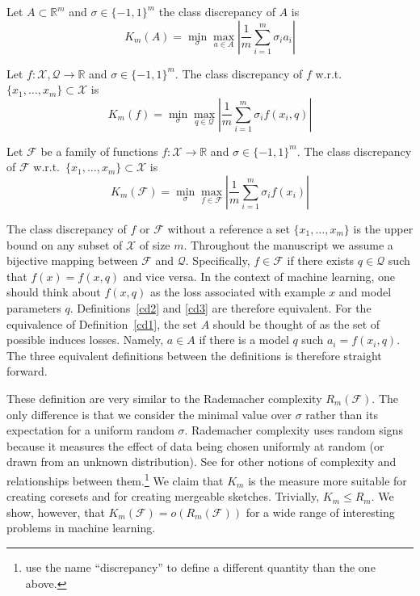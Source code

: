 \documentclass[anon,12pt]{colt2019} %
\newcommand{\R}{\mathbb{R}}
\newcommand{\F}{\mathcal{F}}
\newcommand{\X}{\mathcal{X}}
\newcommand{\Q}{\mathcal{Q}}
\begin{document}
\begin{definition} \label{cd1}
Let $A \subset \R^m$ and $\sigma \in \{-1,1\}^m$ the class discrepancy of $A$ is 
\[
K_m(A)  = \min_\sigma \max_{a\in A} \left| \frac{1}{m} \sum_{i=1}^{m}  \sigma_i  a_i\right| 
\]
\end{definition}
%
\begin{definition}\label{cd2}
Let $f:\X,\Q\rightarrow\R$ and $\sigma \in \{-1,1\}^m$. 
The class discrepancy of $f$ w.r.t.\ $\{x_1,\ldots,x_m\} \subset \X$ is 
\[
K_m(f) =  \min_{\sigma} \max_{q \in \Q}  \left|\frac{1}{m} \sum_{i=1}^{m}\sigma_i f(x_i,q)\right|
\]
\end{definition}
%
\begin{definition}\label{cd3}
Let $\F$ be a family of functions $f:\X\rightarrow\R$ and $\sigma \in \{-1,1\}^m$. 
The class discrepancy of $\F$ w.r.t.\ $\{x_1,\ldots,x_m\} \subset \X$ is 
\[
K_m(\F) =  \min_{\sigma} \max_{f \in \F}  \left| \frac{1}{m} \sum_{i=1}^{m}\sigma_i f(x_i)\right|
\]
\end{definition}
The class discrepancy of $f$ or $\F$ without a reference a set $\{x_1,\ldots,x_m\}$ is the upper bound on any subset of $\X$ of size $m$.
Throughout the manuscript we assume a bijective mapping between $\F$ and $\Q$. 
Specifically, $f \in \F$ if there exists $q \in \Q$ such that $f(x) = f(x,q)$ and vice versa. 
In the context of machine learning, one should think about $f(x,q)$ as the loss associated with example $x$ and model parameters $q$.
Definitions~\ref{cd2} and \ref{cd3} are therefore equivalent. 
For the equivalence of Definition~\ref{cd1}, the set $A$ should be thought of as the set of possible induces losses. 
Namely, $a\in A$ if there is a model $q$ such $a_i = f(x_i,q)$.
The three equivalent definitions between the definitions is therefore straight forward. 


These definition are very similar to the Rademacher complexity $R_m(\F)$.
The only difference is that we consider the minimal value over $\sigma$ rather than its expectation for a uniform random $\sigma$.
Rademacher complexity uses random signs because it measures the effect of data being chosen uniformly at random (or drawn from an unknown distribution). See \cite{Bartlett:2003:RGC:944919.944944} for other notions of complexity and relationships between them.\footnote{\cite{Bartlett:2003:RGC:944919.944944} use the name ``discrepancy'' to define a different quantity than the one above.}
 We claim that $K_m$ is the measure more suitable for creating coresets and for creating mergeable sketches.
Trivially,  $K_m \le R_m$. We show, however, that $K_m(\F) = o(R_m(\F))$ for a wide range of interesting problems in machine learning.
\end{document}
